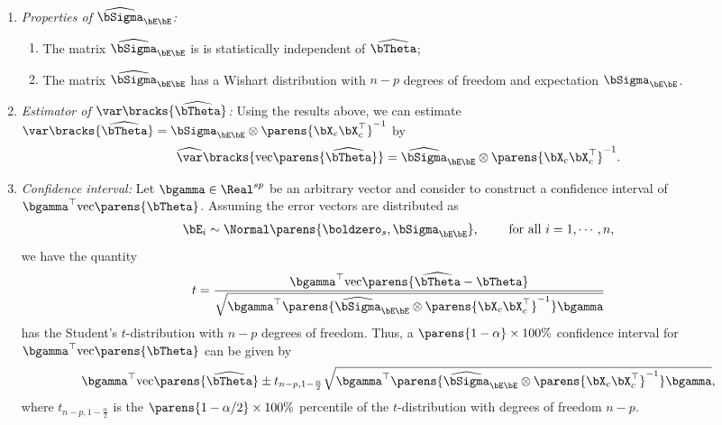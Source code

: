 \documentclass[12pt]{article}
\begin{document}
\begin{enumerate}[label=\textbf{\arabic*.}]
\begin{enumerate}
		\item \textit{Properties of $\widehat{\bSigma}_{\bE \bE}$:}
		\begin{enumerate}
			\item The matrix $\widehat{\bSigma}_{\bE \bE}$ is is statistically independent of $\widehat{\bTheta}$; 
			\item The matrix $\widehat{\bSigma}_{\bE \bE}$ has a Wishart distribution with $n - p$ degrees of freedom and expectation $\bSigma_{\bE \bE}$. %
		\end{enumerate}
		
		\item \textit{Estimator of $\var \bracks{\widehat{\bTheta}}$:} Using the results above, we can estimate $\var \bracks{\widehat{\bTheta}} = \bSigma_{\bE \bE} \otimes \parens{\bX_c \bX_c^\top}^{-1}$ by 
		\begin{align}
			\widehat{\var} \bracks{\mathrm{vec} \parens{\widehat{\bTheta}}} = \widehat{\bSigma}_{\bE \bE} \otimes \parens{\bX_c \bX_c^\top}^{-1}. 
		\end{align}
		
		\item \textit{Confidence interval:} Let $\bgamma \in \Real^{sp}$ be an arbitrary vector and consider to construct a confidence interval of $\bgamma^\top \mathrm{vec} \parens{\bTheta}$. Assuming the error vectors are distributed as 
		\begin{align*}
			\bE_i \sim \Normal \parens{\boldzero_s, \bSigma_{\bE \bE}}, \qquad \text{ for all } i = 1, \cdots, n, 
		\end{align*}
		we have the quantity 
		\begin{align}
			t = \frac{\bgamma^\top \mathrm{vec} \parens{\widehat{\bTheta} - \bTheta}}{\sqrt{\bgamma^\top \parens{\widehat{\bSigma}_{\bE \bE} \otimes \parens{\bX_c \bX_c^\top}^{-1}} \bgamma}}
		\end{align}
		has the Student's $t$-distribution with $n - p$ degrees of freedom.  Thus, a $\parens{1 - \alpha} \times 100\%$ confidence interval for $\bgamma^\top \mathrm{vec} \parens{\bTheta}$ can be given by 
		\begin{align*}
			\bgamma^\top \mathrm{vec} \parens{\widehat{\bTheta}} \pm t_{n-p, 1-\frac{\alpha}{2}} \sqrt{\bgamma^\top \parens{\widehat{\bSigma}_{\bE \bE} \otimes \parens{\bX_c \bX_c^\top}^{-1}} \bgamma}, 
		\end{align*}
		where $t_{n-p, 1-\frac{\alpha}{2}}$ is the $\parens{1 - \alpha/2} \times 100 \%$ percentile of the $t$-distribution with degrees of freedom $n-p$. 


\end{enumerate}
\end{enumerate}
\end{document}
